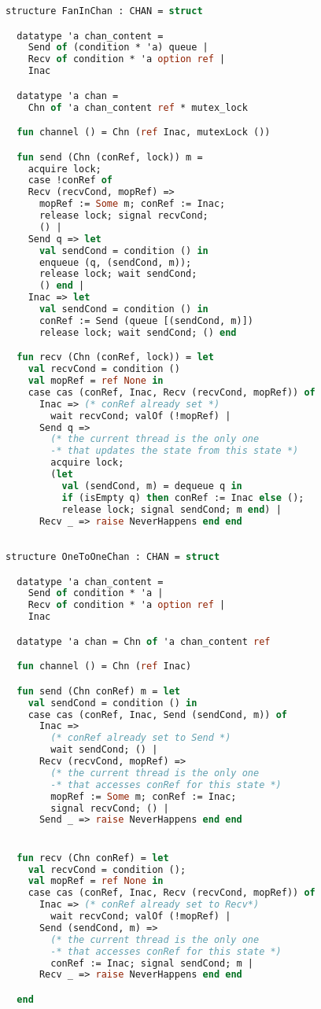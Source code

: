 \begin{lstlisting}[language=ML, style=codestyle1]
  structure FanInChan : CHAN = struct

  datatype 'a chan_content =
    Send of (condition * 'a) queue |
    Recv of condition * 'a option ref |
    Inac

  datatype 'a chan =
    Chn of 'a chan_content ref * mutex_lock

  fun channel () = Chn (ref Inac, mutexLock ())

  fun send (Chn (conRef, lock)) m = 
    acquire lock;
    case !conRef of
    Recv (recvCond, mopRef) => 
      mopRef := Some m; conRef := Inac;
      release lock; signal recvCond;
      () |
    Send q => let
      val sendCond = condition () in
      enqueue (q, (sendCond, m));
      release lock; wait sendCond;
      () end |
    Inac => let
      val sendCond = condition () in
      conRef := Send (queue [(sendCond, m)])
      release lock; wait sendCond; () end 

  fun recv (Chn (conRef, lock)) = let
    val recvCond = condition () 
    val mopRef = ref None in
    case cas (conRef, Inac, Recv (recvCond, mopRef)) of
      Inac => (* conRef already set *)
        wait recvCond; valOf (!mopRef) |
      Send q =>
        (* the current thread is the only one
        -* that updates the state from this state *)
        acquire lock;
        (let
          val (sendCond, m) = dequeue q in
          if (isEmpty q) then conRef := Inac else (); 
          release lock; signal sendCond; m end) |
      Recv _ => raise NeverHappens end end

  \end{lstlisting}

\begin{lstlisting}[language=ML, style=codestyle1]

structure OneToOneChan : CHAN = struct

  datatype 'a chan_content =
    Send of condition * 'a |
    Recv of condition * 'a option ref |
    Inac  

  datatype 'a chan = Chn of 'a chan_content ref

  fun channel () = Chn (ref Inac)

  fun send (Chn conRef) m = let
    val sendCond = condition () in
    case cas (conRef, Inac, Send (sendCond, m)) of
      Inac => 
        (* conRef already set to Send *)
        wait sendCond; () |
      Recv (recvCond, mopRef) =>
        (* the current thread is the only one
        -* that accesses conRef for this state *)
        mopRef := Some m; conRef := Inac;
        signal recvCond; () |
      Send _ => raise NeverHappens end end


  fun recv (Chn conRef) = let
    val recvCond = condition ();
    val mopRef = ref None in
    case cas (conRef, Inac, Recv (recvCond, mopRef)) of
      Inac => (* conRef already set to Recv*)
        wait recvCond; valOf (!mopRef) |
      Send (sendCond, m) =>
        (* the current thread is the only one
        -* that accesses conRef for this state *)
        conRef := Inac; signal sendCond; m |
      Recv _ => raise NeverHappens end end 

  end
  \end{lstlisting}

